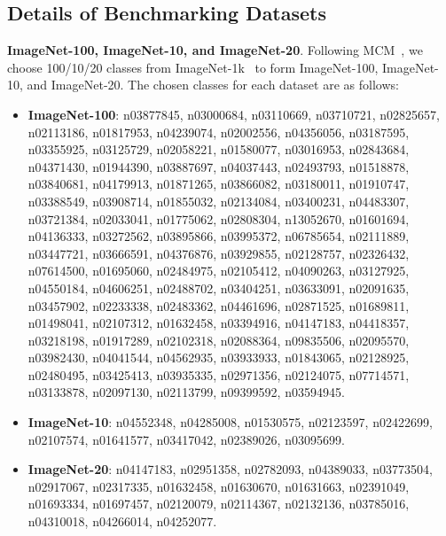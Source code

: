 \subsection{Details of Benchmarking Datasets}
\label{Appendix: Sec: datasets}

\textbf{ImageNet-100, ImageNet-10, and ImageNet-20}. 
Following MCM~\cite{ming2022delving}, we choose 100/10/20 classes from ImageNet-1k~\cite{krizhevskyImagenetClassificationDeep2012} to form ImageNet-100, ImageNet-10, and ImageNet-20. 
The chosen classes for each dataset are as follows:  
\begin{itemize}
    \item 
    \textbf{ImageNet-100}: n03877845, n03000684, n03110669, n03710721, n02825657, n02113186, n01817953, n04239074, n02002556, n04356056, n03187595, n03355925, n03125729, n02058221, n01580077, n03016953, n02843684, n04371430, n01944390, n03887697, n04037443, n02493793, n01518878, n03840681, n04179913, n01871265, n03866082, n03180011, n01910747, n03388549, n03908714, n01855032, n02134084, n03400231, n04483307, n03721384, n02033041, n01775062, n02808304, n13052670, n01601694, n04136333, n03272562, n03895866, n03995372, n06785654, n02111889, n03447721, n03666591, n04376876, n03929855, n02128757, n02326432, n07614500, n01695060, n02484975, n02105412, n04090263, n03127925, n04550184, n04606251, n02488702, n03404251, n03633091, n02091635, n03457902, n02233338, n02483362, n04461696, n02871525, n01689811, n01498041, n02107312, n01632458, n03394916, n04147183, n04418357, n03218198, n01917289, n02102318, n02088364, n09835506, n02095570, n03982430, n04041544, n04562935, n03933933, n01843065, n02128925, n02480495, n03425413, n03935335, n02971356, n02124075, n07714571, n03133878, n02097130, n02113799, n09399592, n03594945.
    
    \item
    \textbf{ImageNet-10}: n04552348, n04285008, n01530575, n02123597, n02422699, n02107574, n01641577, n03417042, n02389026, n03095699.

    \item
    \textbf{ImageNet-20}: n04147183, n02951358, n02782093, n04389033, n03773504, n02917067, n02317335, n01632458, n01630670, n01631663, n02391049, n01693334, n01697457, n02120079, n02114367, n02132136, n03785016, n04310018, n04266014, n04252077.
    
\end{itemize}

